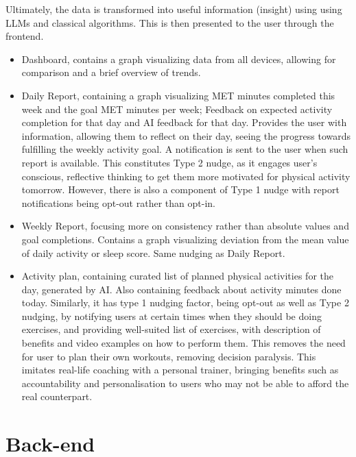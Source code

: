 Ultimately, the data is transformed into useful information (insight) using using LLMs and classical algorithms. This is then presented to the user through the frontend. 
\begin{itemize}
    \item {Dashboard, contains a graph visualizing data from all devices, allowing for comparison and a brief overview of trends.}
    \item {Daily Report, containing a graph visualizing MET minutes completed this week and the goal MET minutes per week; Feedback on expected activity completion for that day and AI feedback for that day. Provides the user with information, allowing them to reflect on their day, seeing the progress towards fulfilling the weekly activity goal. A notification is sent to the user when such report is available. This constitutes Type 2 nudge, as it  engages user's conscious, reflective thinking to get them more motivated for physical activity tomorrow. However, there is also a component of Type 1 nudge with report notifications being opt-out rather than opt-in.}
    \item {Weekly Report, focusing more on consistency rather than absolute values and goal completions. Contains a graph visualizing deviation from the mean value of daily activity or sleep score. Same nudging as Daily Report.}
    \item {Activity plan, containing curated list of planned physical activities for the day, generated by AI. Also containing feedback about activity minutes done today. Similarly, it has type 1 nudging factor, being opt-out as well as Type 2 nudging, by notifying users at certain times when they should be doing exercises, and providing well-suited list of exercises, with description of benefits and video examples on how to perform them. This removes the need for user to plan their own workouts, removing decision paralysis. This imitates real-life coaching with a personal trainer, bringing benefits such as accountability and personalisation to users who may not be able to afford the real counterpart.}
\end{itemize}

\section{Back-end}


